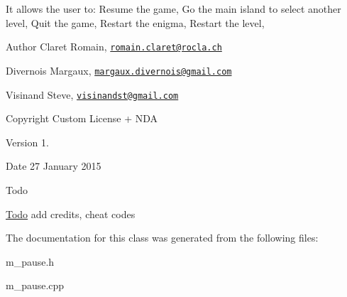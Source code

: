 It allows the user to\+: Resume the game, Go the main island to select another level, Quit the game, Restart the enigma, Restart the level, \begin{DoxyAuthor}{Author}
Claret Romain, \href{mailto:romain.claret@rocla.ch}{\tt romain.\+claret@rocla.\+ch} 

Divernois Margaux, \href{mailto:margaux.divernois@gmail.com}{\tt margaux.\+divernois@gmail.\+com} 

Visinand Steve, \href{mailto:visinandst@gmail.com}{\tt visinandst@gmail.\+com} 
\end{DoxyAuthor}
\begin{DoxyCopyright}{Copyright}
Custom License + N\+D\+A 
\end{DoxyCopyright}
\begin{DoxyVersion}{Version}
1. 
\end{DoxyVersion}
\begin{DoxyDate}{Date}
27 January 2015 
\end{DoxyDate}
\begin{DoxyRefDesc}{Todo}
\item[\hyperlink{todo__todo000011}{Todo}]add credits, cheat codes \end{DoxyRefDesc}


The documentation for this class was generated from the following files\+:\begin{DoxyCompactItemize}
\item 
m\+\_\+pause.\+h\item 
m\+\_\+pause.\+cpp\end{DoxyCompactItemize}
